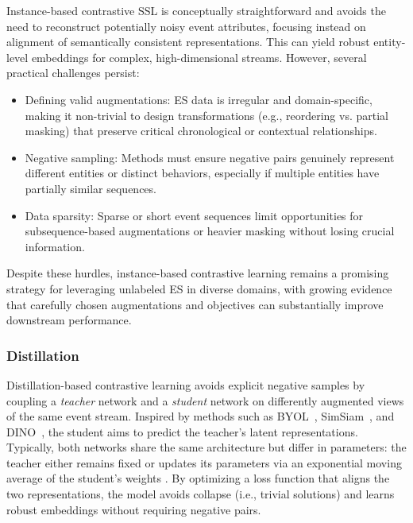 \documentclass[twoside,11pt]{article}
\begin{document}
Instance-based contrastive SSL is conceptually straightforward and avoids the need to reconstruct potentially noisy event attributes, focusing instead on alignment of semantically consistent representations. This can yield robust entity-level embeddings for complex, high-dimensional streams. However, several practical challenges persist:
\begin{itemize}
\item Defining valid augmentations: ES data is irregular and domain-specific, making it non-trivial to design transformations (e.g., reordering vs. partial masking) that preserve critical chronological or contextual relationships.
\item Negative sampling: Methods must ensure negative pairs genuinely represent different entities or distinct behaviors, especially if multiple entities have partially similar sequences.
\item Data sparsity: Sparse or short event sequences limit opportunities for subsequence-based augmentations or heavier masking without losing crucial information.
\end{itemize}
Despite these hurdles, instance-based contrastive learning remains a promising strategy for leveraging unlabeled ES in diverse domains, with growing evidence that carefully chosen augmentations and objectives can substantially improve downstream performance.

\subsubsection{Distillation}
\label{subsubsec:distillation-methods}

Distillation-based contrastive learning avoids explicit negative samples by coupling a {\it teacher} network and a {\it student} network on differently augmented views of the same event stream. Inspired by methods such as BYOL~, SimSiam~, and DINO~, the student aims to predict the teacher’s latent representations. Typically, both networks share the same architecture but differ in parameters: the teacher either remains fixed  or updates its parameters via an exponential moving average of the student's weights . By optimizing a loss function that aligns the two representations, the model avoids collapse (i.e., trivial solutions) and learns robust embeddings without requiring negative pairs.
\end{document}
